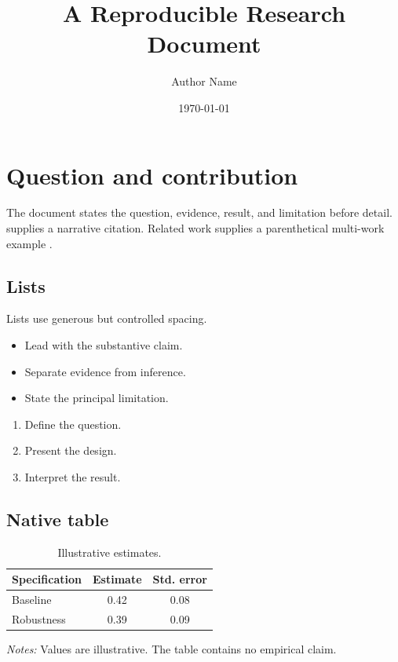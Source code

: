 \documentclass[11pt,a4paper]{report}
\title{A Reproducible Research Document}
\author{Author Name}
\date{\today}
\begin{document}
\maketitle
\tableofcontents

\chapter{Question and contribution}
The document states the question, evidence, result, and limitation before detail. \citet{example2025} supplies a narrative citation. Related work supplies a parenthetical multi-work example \citep{example2025,companion2024}.

\section{Lists}
Lists use generous but controlled spacing.
\begin{itemize}
  \item Lead with the substantive claim.
  \item Separate evidence from inference.
  \item State the principal limitation.
\end{itemize}
\begin{enumerate}
  \item Define the question.
  \item Present the design.
  \item Interpret the result.
\end{enumerate}

\section{Native table}
\begin{table}[H]
  \centering
  \caption{Illustrative estimates.}
  \label{tab:estimates}
    \begin{tabular}{lcc}
      \toprule
      Specification & {Estimate} & {Std. error} \\
      \midrule
      Baseline & 0.42 & 0.08 \\
      Robustness & 0.39 & 0.09 \\
      \bottomrule
    \end{tabular}

    \parbox{0.72\textwidth}{\footnotesize\textit{Notes:} Values are illustrative. The table contains no empirical claim.}
\end{table}
\end{document}
